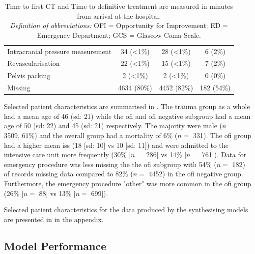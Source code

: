 \documentclass[12pt, letterpaper]{article}
\begin{document}
\begin{table}[h!]
{\begin{tabular}{lccc}
            \hspace{3mm}Intracranial pressure measurement & 34 (\textless1\%) & 28 (\textless1\%) & 6 (2\%)          \\
            \hspace{3mm}Revascularisation                 & 22 (\textless1\%) & 15 (\textless1\%) & 7 (2\%)          \\
            \hspace{3mm}Pelvis packing                    & 2 (\textless1\%)  & 2 (\textless1\%)  & 0 (0\%)          \\
            \hspace{3mm}Missing                           & 4634 (80\%)       & 4452 (82\%)       & 182 (54\%)       \\
            \bottomrule
        \end{tabular}
    }
    \caption*{\scriptsize Time to first CT and Time to definitive treatment are measured in minutes from arrival at the hospital.\\
        \textit{Definition of abbreviations:} OFI = Opportunity for Improvement; ED = Emergency Department; GCS = Glascow Coma Scale.}
\end{table}

Selected patient characteristics are summarised in . The trauma group as a whole had a mean age of 46 (\acrshort{sd}: 21) while the \acrshort{ofi} and \acrshort{ofi} negative subgroup had a mean age of 50 (\acrshort{sd}: 22) and 45 (\acrshort{sd}: 21) respectively. The majority were male ($n = $ \num{3509}, 61\%) and the overall group had a mortality of 6\% ($n = $ \num{331}). The \acrshort{ofi} group had a higher mean \acrshort{iss} (18 [\acrshort{sd}: 10] vs 10 [\acrshort{sd}: 11]) and were admitted to the intensive care unit more frequently (30\% [$n = $ \num{286}] vs 14\% [$n = $ \num{761}]). Data for emergency procedure was less missing the the \acrshort{ofi} subgroup with 54\% ($n = $ 182) of records missing data compared to 82\% ($n = $ \num{4452}) in the \acrshort{ofi} negative group. Furthermore, the emergency procedure "other" was more common in the \acrshort{ofi} group (26\% [$n = $ \num{88}] vs 13\% [$n = $ \num{699}]).

Selected patient characteristics for the data produced by the synthesising models are presented in  in the appendix.

\subsection{Model Performance}
\end{document}
